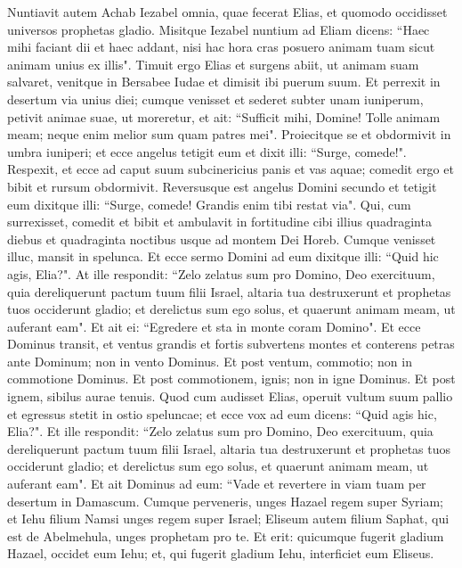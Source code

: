 \begin{biblechapter}  
\verse Nuntiavit autem Achab Iezabel omnia, quae fecerat Elias, et quomodo occidisset universos prophetas gladio. 
\verse Misitque Iezabel nuntium ad Eliam dicens: “Haec mihi faciant dii et haec addant, nisi hac hora cras posuero animam tuam sicut animam unius ex illis". 
\verse Timuit ergo Elias et surgens abiit, ut animam suam salvaret, venitque in Bersabee Iudae et dimisit ibi puerum suum. 
\verse Et perrexit in desertum via unius diei; cumque venisset et sederet subter unam iuniperum, petivit animae suae, ut moreretur, et ait: “Sufficit mihi, Domine! Tolle animam meam; neque enim melior sum quam patres mei". 
\verse Proiecitque se et obdormivit in umbra iuniperi; et ecce angelus tetigit eum et dixit illi: “Surge, comede!". 
\verse Respexit, et ecce ad caput suum subcinericius panis et vas aquae; comedit ergo et bibit et rursum obdormivit.  
\verse Reversusque est angelus Domini secundo et tetigit eum dixitque illi: “Surge, comede! Grandis enim tibi restat via". 
\verse Qui, cum surrexisset, comedit et bibit et ambulavit in fortitudine cibi illius quadraginta diebus et quadraginta noctibus usque ad montem Dei Horeb. 
\verse Cumque venisset illuc, mansit in spelunca. Et ecce sermo Domini ad eum dixitque illi: “Quid hic agis, Elia?". 
\verse At ille respondit: “Zelo zelatus sum pro Domino, Deo exercituum, quia dereliquerunt pactum tuum filii Israel, altaria tua destruxerunt et prophetas tuos occiderunt gladio; et derelictus sum ego solus, et quaerunt animam meam, ut auferant eam". 
\verse Et ait ei: “Egredere et sta in monte coram Domino". Et ecce Dominus transit, et ventus grandis et fortis subvertens montes et conterens petras ante Dominum; non in vento Dominus. Et post ventum, commotio; non in commotione Dominus. 
\verse Et post commotionem, ignis; non in igne Dominus. Et post ignem, sibilus aurae tenuis. 
\verse Quod cum audisset Elias, operuit vultum suum pallio et egressus stetit in ostio speluncae; et ecce vox ad eum dicens: “Quid agis hic, Elia?".  
\verse Et ille respondit: “Zelo zelatus sum pro Domino, Deo exercituum, quia dereliquerunt pactum tuum filii Israel, altaria tua destruxerunt et prophetas tuos occiderunt gladio; et derelictus sum ego solus, et quaerunt animam meam, ut auferant eam". 
\verse Et ait Dominus ad eum: “Vade et revertere in viam tuam per desertum in Damascum. Cumque perveneris, unges Hazael regem super Syriam; 
\verse et Iehu filium Namsi unges regem super Israel; Eliseum autem filium Saphat, qui est de Abelmehula, unges prophetam pro te. 
\verse Et erit: quicumque fugerit gladium Hazael, occidet eum Iehu; et, qui fugerit gladium Iehu, interficiet eum Eliseus. 

\end{biblechapter}
